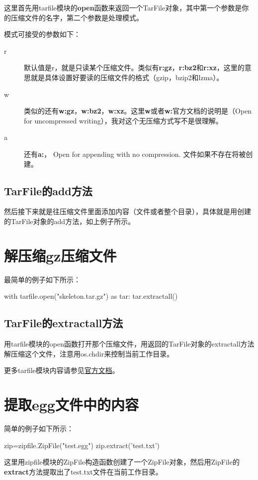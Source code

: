 \documentclass[12pt,oneside]{book}
\begin{document}
\begin{common-format}
这里首先用tarfile模块的\textbf{open}函数来返回一个TarFile对象，其中第一个参数是你的压缩文件的名字，第二个参数是处理模式。

模式可接受的参数如下：
\begin{description}
\item[r] 默认值是r，就是只读某个压缩文件。类似有\textbf{r:gz}，\textbf{r:bz2}和\textbf{r:xz}，这里的意思就是具体设置好要读的压缩文件的格式（gzip，bzip2和lzma）。
\item[w] 类似的还有\textbf{w:gz}，\textbf{w:bz2}，\textbf{w:xz}。这里\textbf{w}或者\textbf{w:}官方文档的说明是（Open for uncompressed writing），我对这个无压缩方式写不是很理解。
\item[a] 还有\textbf{a:}， 	Open for appending with no compression. 文件如果不存在将被创建。
\end{description}

\subsection{TarFile的add方法}
然后接下来就是往压缩文件里面添加内容（文件或者整个目录），具体就是用创建的TarFile对象的add方法，如上例子所示。

\section{解压缩gz压缩文件}
最简单的例子如下所示：
\begin{tcbpython}[]
with tarfile.open("skeleton.tar.gz") as tar:
    tar.extractall()
\end{tcbpython}

\subsection{TarFile的extractall方法}
用tarfile模块的open函数打开那个压缩文件，用返回的TarFile对象的extractall方法解压缩这个文件，注意用os.chdir来控制当前工作目录。


\begin{large}
更多tarfile模块内容请参见\href{https://docs.python.org/3.4/library/tarfile.html}{官方文档}。
\end{large}

\section{提取egg文件中的内容}
简单的例子如下所示：
\begin{tcbpython}[]
zip=zipfile.ZipFile("test.egg")
zip.extract('test.txt')
\end{tcbpython}
这里用zipfile模块的ZipFile构造函数创建了一个ZipFile对象，然后用ZipFile的\textbf{extract}方法提取出了test.txt文件在当前工作目录。


\end{common-format}
\end{document}
